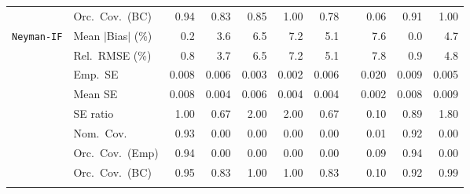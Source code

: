 \begin{landscape}
\begin{longtable}{llrrrrrrrrr}
 & Orc.\ Cov.\ (BC) & \cellcolor{rankone}0.94 & 0.83 & 0.85 & \cellcolor{rankthree}1.00 & 0.78 &  & 0.06 & \cellcolor{ranktwo}0.91 & \cellcolor{rankthree}1.00 \\
\addlinespace[2pt]
\quad \texttt{Neyman-IF} & Mean $|$Bias$|$ (\%) & \cellcolor{ranktwo}0.2 & \cellcolor{rankthree}3.6 & 6.5 & 7.2 & 5.1 &  & 7.6 & \cellcolor{rankone}0.0 & 4.7 \\
 & Rel.\ RMSE (\%) & \cellcolor{rankone}0.8 & \cellcolor{rankthree}3.7 & 6.5 & 7.2 & 5.1 &  & 7.8 & \cellcolor{ranktwo}0.9 & 4.8 \\
 & Emp.\ SE & 0.008 & 0.006 & 0.003 & 0.002 & 0.006 &  & 0.020 & 0.009 & 0.005 \\
 & Mean SE & 0.008 & 0.004 & 0.006 & 0.004 & 0.004 &  & 0.002 & 0.008 & 0.009 \\
 & SE ratio & \cellcolor{rankone}1.00 & \cellcolor{rankthree}0.67 & 2.00 & 2.00 & \cellcolor{rankthree}0.67 &  & 0.10 & \cellcolor{ranktwo}0.89 & 1.80 \\
 & Nom.\ Cov. & \cellcolor{rankone}0.93 & 0.00 & 0.00 & 0.00 & 0.00 &  & \cellcolor{rankthree}0.01 & \cellcolor{ranktwo}0.92 & 0.00 \\
 & Orc.\ Cov.\ (Emp) & \cellcolor{rankone}0.94 & \cellcolor{rankthree}0.00 & \cellcolor{rankthree}0.00 & \cellcolor{rankthree}0.00 & \cellcolor{rankthree}0.00 &  & \cellcolor{ranktwo}0.09 & \cellcolor{rankone}0.94 & \cellcolor{rankthree}0.00 \\
 & Orc.\ Cov.\ (BC) & \cellcolor{rankone}0.95 & 0.83 & 1.00 & 1.00 & 0.83 &  & 0.10 & \cellcolor{ranktwo}0.92 & \cellcolor{rankthree}0.99 \\
\addlinespace[2pt]
\end{longtable}
\end{landscape}
